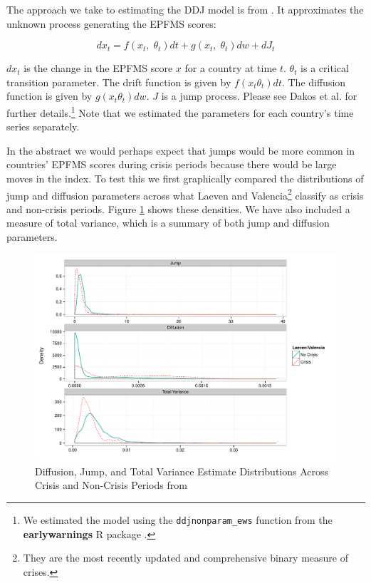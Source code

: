\documentclass[]{article}
\begin{document}
The approach we take to estimating the DDJ model is from \cite{Carpenter2011}. It approximates the unknown process generating the EPFMS scores:

\begin{equation}
      dx_{t} = f(x_{t},\;\theta_{t})dt + g(x_{t},\;\theta_{t})dw + dJ_{t}
\end{equation}

\noindent $dx_{t}$ is the change in the EPFMS score $x$ for a country at time $t$. $\theta_{t}$ is a critical transition parameter. The drift function is given by $f(x_{t}\theta_{t})dt$. The diffusion function is given by $g(x_{t}\theta_{t})dw$. $J$ is a jump process. Please see Dakos et al. \citeyearpar[7]{Dakos2012} for further details.\footnote{We estimated the model using the \texttt{ddjnonparam\_ews} function from the \textbf{earlywarnings} R package \citep{earlywarnings2013}.} Note that we estimated the parameters for each country's time series separately.

In the abstract we would perhaps expect that jumps would be more common in countries' EPFMS scores during crisis periods because there would be large moves in the index. To test this we first graphically compared the distributions of jump and diffusion parameters across what Laeven and Valencia\footnote{They are the most recently updated and comprehensive binary measure of crises.} classify as crisis and non-crisis periods. Figure \ref{comp_jump_diff} shows these densities. We have also included a measure of total variance, which is a summary of both jump and diffusion parameters.

\begin{figure}
    \caption{Diffusion, Jump, and Total Variance Estimate Distributions Across Crisis and Non-Crisis Periods from \cite{laeven2013}}
    \label{comp_jump_diff}
    \begin{center}
        \includegraphics[scale=0.5]{analysis/figures/compare_jump_diffusion_basic.pdf}
    \end{center}
\end{figure}
\end{document}

